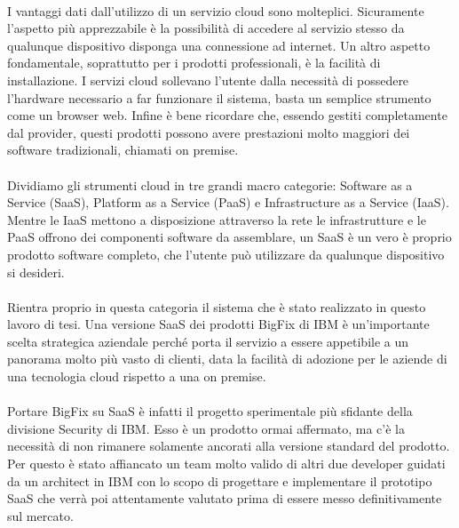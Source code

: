 \paragraph{}
I vantaggi dati dall'utilizzo di un servizio cloud sono molteplici. Sicuramente l'aspetto più apprezzabile è la possibilità di accedere al servizio stesso da qualunque dispositivo disponga una connessione ad internet. Un altro aspetto fondamentale, soprattutto per i prodotti professionali, è la facilità di installazione. I servizi cloud sollevano l'utente dalla necessità di possedere l'hardware necessario a far funzionare il sistema, basta un semplice strumento come un browser web. Infine è bene ricordare che, essendo gestiti completamente dal provider, questi prodotti possono avere prestazioni molto maggiori dei software tradizionali, chiamati on premise.
\paragraph{}
Dividiamo gli strumenti cloud in tre grandi macro categorie: Software as a Service (SaaS), Platform as a Service (PaaS) e Infrastructure as a Service (IaaS). Mentre le IaaS mettono a disposizione attraverso la rete le infrastrutture e le PaaS offrono dei componenti software da assemblare, un SaaS è un vero è proprio prodotto software completo, che l'utente può utilizzare da qualunque dispositivo si desideri.

\paragraph{}
Rientra proprio in questa categoria il sistema che è stato realizzato in questo lavoro di tesi. Una versione SaaS dei prodotti BigFix di IBM è un'importante scelta strategica aziendale perché porta il servizio a essere appetibile a un panorama molto più vasto di clienti, data la facilità di adozione per le aziende di una tecnologia cloud rispetto a una on premise.
\paragraph{}
Portare BigFix su SaaS è infatti il progetto sperimentale più sfidante della divisione Security di IBM. Esso è un prodotto ormai affermato, ma c'è la necessità di non rimanere solamente ancorati alla versione standard del prodotto. Per questo è stato affiancato un team molto valido di altri due developer guidati da un architect in IBM con lo scopo di progettare e implementare il prototipo SaaS che verrà poi attentamente valutato prima di essere messo definitivamente sul mercato.

